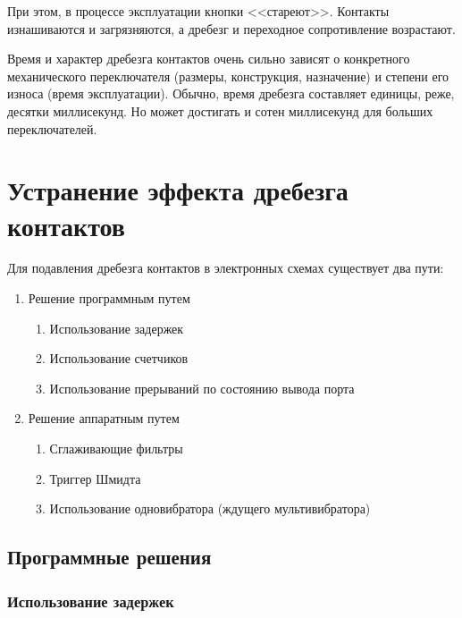 \documentclass{altsu-report}
\begin{document}
При этом, в процессе эксплуатации кнопки <<стареют>>. Контакты изнашиваются и загрязняются, а дребезг и переходное сопротивление возрастают.

Время и характер дребезга контактов очень сильно зависят о конкретного механического переключателя (размеры, конструкция, назначение) и степени его износа (время эксплуатации). Обычно, время дребезга составляет единицы, реже, десятки миллисекунд. Но может достигать и сотен миллисекунд для больших переключателей.

\chapter{Устранение эффекта дребезга контактов}

Для подавления дребезга контактов в электронных схемах существует два пути:

\begin{enumerate}
    \item Решение программным путем

    \begin{enumerate}
        \item Использование задержек
    
        \item Использование счетчиков
    
        \item Использование прерываний по состоянию вывода порта
    \end{enumerate}

    \item Решение аппаратным путем

    \begin{enumerate}
        \item Сглаживающие фильтры
    
        \item Триггер Шмидта
    
        \item Использование одновибратора (ждущего мультивибратора)
    \end{enumerate}
\end{enumerate}

\section{Программные решения}

\subsection{Использование задержек}
\end{document}
